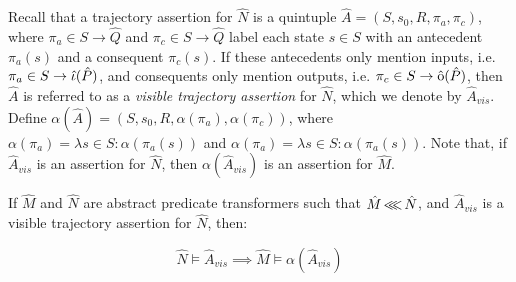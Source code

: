 Recall that a trajectory assertion for $\hat N$ is a quintuple $\hat A = (S, s_{0}, R, \pi_{a}, \pi_{c})$, where $\pi_{a} \in S \rightarrow \hat Q$ and $\pi_{c} \in S \rightarrow \hat Q$ label each state $s \in S$ with an antecedent $\pi_{a}(s)$ and a consequent $\pi_{c}(s)$. If these antecedents only mention inputs, i.e. $\pi_{a} \in S \rightarrow \operatorname{\hat{\iota}}(\hat P)$, and consequents only mention outputs, i.e. $\pi_{c} \in S \rightarrow \operatorname{\hat{\mathrm{o}}}(\hat P)$, then $\hat A$ is referred to as a \textit{visible trajectory assertion} for $\hat N$, which we denote by $\hat A_{vis}$. Define $\alpha(\hat A) = (S, s_{0}, R, \alpha(\pi_{a}), \alpha(\pi_{c}))$, where $\alpha(\pi_{a}) = \lambda s \in S : \alpha(\pi_{a}(s))$ and $\alpha(\pi_{a}) = \lambda s \in S : \alpha(\pi_{a}(s))$. Note that, if $\hat A_{vis}$ is an assertion for $\hat N$, then $\alpha(\hat A_{vis})$ is an assertion for $\hat M$.

\begin{theorem}
\label{thm:refinement}
If $\hat M$ and $\hat N$ are abstract predicate transformers such that $\hat M \operatorname{\lll} \hat N$, and $\hat A_{vis}$ is a visible trajectory assertion for $\hat N$, then:

\begin{equation*}
\hat N \models \hat A_{vis} \implies \hat M \models \alpha(\hat A_{vis})
\end{equation*}
\end{theorem}
